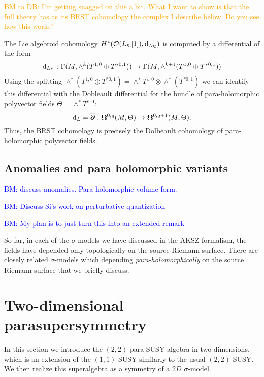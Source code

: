 \documentclass[letterpaper,12pt]{article}
\newcommand{\KK}{\mathcal{K}}
\newcommand{\cO}{\mathcal{O}}
\def\d{{\rm d}}
\newcommand{\p}{\partial}
\newcommand{\pd}{\overline{\bm{\p}}}
\theoremstyle{definition}
\theoremstyle{remark}
\theoremstyle{examples}
\def\brian{\textcolor{blue}{BM: }\textcolor{blue}}
\def\btd{\textcolor{orange}{BM to DB: }\textcolor{orange}}
\begin{document}
\btd{I'm getting snagged on this a bit. 
What I want to show is that the full theory has as its BRST cohomology the complex I describe below. 
Do you see how this works?
}

The Lie algebroid cohomology $H^*(\cO(L_{\KK}[1]), \d_{L_\KK})$ is computed by a differential of the form
\[
\d_{L_\KK} : \Gamma(M , \wedge^k (T^{1,0} \oplus T^{*0,1})) \to \Gamma(M , \wedge^{k+1} (T^{1,0} \oplus T^{*0,1})) 
\]
Using the splitting $\wedge^*(T^{1,0} \oplus T^{*0,1}) = \wedge^* T^{1,0} \otimes \wedge^*(T^{*0,1})$ we can identify this differential with the Dobleault differential for the bundle of para-holomorphic polyvector fields $\Theta = \wedge^* T^{1,0}$:
\[
\d_L = \pd : \mathbf{\Omega}^{0,q} (M , \Theta) \to \mathbf{\Omega}^{0,q+1} (M , \Theta)  .
\]
Thus, the BRST cohomology is precisely the Dolbeault cohomology of para-holomorphic polyvector fields.


\subsection{Anomalies and para holomorphic variants}

\brian{discuss anomalies. Para-holomorphic volume form.}

\brian{Discuss Si's work on perturbative quantization}


\brian{My plan is to just turn this into an extended remark}

So far, in each of the $\sigma$-models we have discussed in the AKSZ formalism, the fields have depended only topologically on the source Riemann surface. 
There are closely related $\sigma$-models which depending {\em para-holomorphically} on the source Riemann surface that we briefly discuss. 
\section{Two-dimensional parasupersymmetry}  \label{sec: parasusy}

In this section we introduce the $(2,2)$ para-SUSY algebra in two dimensions, which is an extension of the $(1,1)$ SUSY similarly to the usual $(2,2)$ SUSY. We then realize this superalgebra as a symmetry of a $2D$ $\sigma$-model.
\end{document}
